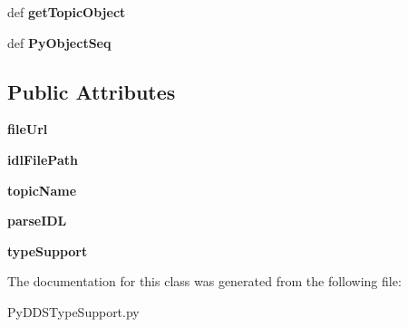 \begin{DoxyCompactItemize}
\item 
\hypertarget{classddswrapper_1_1_py_d_d_s_type_support_1_1_py_d_d_s_type_support_a57569048614d32fb8e80718504330356}{
def {\bfseries getTopicObject}}
\label{classddswrapper_1_1_py_d_d_s_type_support_1_1_py_d_d_s_type_support_a57569048614d32fb8e80718504330356}

\item 
\hypertarget{classddswrapper_1_1_py_d_d_s_type_support_1_1_py_d_d_s_type_support_a488900b63998f0f51a1795b0ffc98f3b}{
def {\bfseries PyObjectSeq}}
\label{classddswrapper_1_1_py_d_d_s_type_support_1_1_py_d_d_s_type_support_a488900b63998f0f51a1795b0ffc98f3b}

\end{DoxyCompactItemize}
\subsection*{Public Attributes}
\begin{DoxyCompactItemize}
\item 
\hypertarget{classddswrapper_1_1_py_d_d_s_type_support_1_1_py_d_d_s_type_support_ae942a8f69ca93ca07a6efbbc6e1612f4}{
{\bfseries fileUrl}}
\label{classddswrapper_1_1_py_d_d_s_type_support_1_1_py_d_d_s_type_support_ae942a8f69ca93ca07a6efbbc6e1612f4}

\item 
\hypertarget{classddswrapper_1_1_py_d_d_s_type_support_1_1_py_d_d_s_type_support_a8f843f2ac802e16365f8d3e5d1fbc0ee}{
{\bfseries idlFilePath}}
\label{classddswrapper_1_1_py_d_d_s_type_support_1_1_py_d_d_s_type_support_a8f843f2ac802e16365f8d3e5d1fbc0ee}

\item 
\hypertarget{classddswrapper_1_1_py_d_d_s_type_support_1_1_py_d_d_s_type_support_a4af4697a30f6e132fb5c05f27361ddb8}{
{\bfseries topicName}}
\label{classddswrapper_1_1_py_d_d_s_type_support_1_1_py_d_d_s_type_support_a4af4697a30f6e132fb5c05f27361ddb8}

\item 
\hypertarget{classddswrapper_1_1_py_d_d_s_type_support_1_1_py_d_d_s_type_support_a6beaef183c5c371580776d08b6a52be6}{
{\bfseries parseIDL}}
\label{classddswrapper_1_1_py_d_d_s_type_support_1_1_py_d_d_s_type_support_a6beaef183c5c371580776d08b6a52be6}

\item 
\hypertarget{classddswrapper_1_1_py_d_d_s_type_support_1_1_py_d_d_s_type_support_ad64a63720dfc76003247d479a10139f9}{
{\bfseries typeSupport}}
\label{classddswrapper_1_1_py_d_d_s_type_support_1_1_py_d_d_s_type_support_ad64a63720dfc76003247d479a10139f9}

\end{DoxyCompactItemize}


The documentation for this class was generated from the following file:\begin{DoxyCompactItemize}
\item 
PyDDSTypeSupport.py\end{DoxyCompactItemize}
